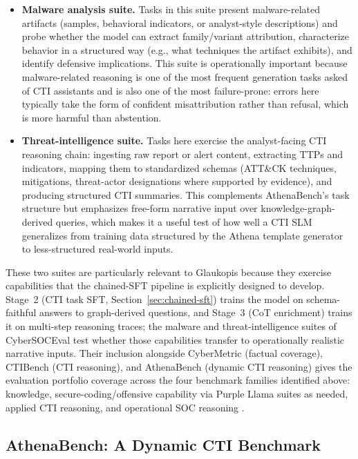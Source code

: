 \documentclass[unnumsec,webpdf,contemporary,large]{oup-authoring-template}
\theoremstyle{thmstyleone}
\theoremstyle{thmstyletwo}
\theoremstyle{thmstylethree}
\begin{document}
\begin{itemize}
  \item \textbf{Malware analysis suite.} Tasks in this suite present malware-related artifacts (samples, behavioral indicators, or analyst-style descriptions) and probe whether the model can extract family/variant attribution, characterize behavior in a structured way (e.g., what techniques the artifact exhibits), and identify defensive implications. This suite is operationally important because malware-related reasoning is one of the most frequent generation tasks asked of CTI assistants and is also one of the most failure-prone: errors here typically take the form of confident misattribution rather than refusal, which is more harmful than abstention.
  \item \textbf{Threat-intelligence suite.} Tasks here exercise the analyst-facing CTI reasoning chain: ingesting raw report or alert content, extracting TTPs and indicators, mapping them to standardized schemas (ATT\&CK techniques, mitigations, threat-actor designations where supported by evidence), and producing structured CTI summaries. This complements AthenaBench's task structure but emphasizes free-form narrative input over knowledge-graph-derived queries, which makes it a useful test of how well a CTI SLM generalizes from training data structured by the Athena template generator to less-structured real-world inputs.
\end{itemize}

These two suites are particularly relevant to Glaukopis because they exercise capabilities that the chained-SFT pipeline is explicitly designed to develop. Stage~2 (CTI task SFT, Section~\ref{sec:chained-sft}) trains the model on schema-faithful answers to graph-derived questions, and Stage~3 (CoT enrichment) trains it on multi-step reasoning traces; the malware and threat-intelligence suites of CyberSOCEval test whether those capabilities transfer to operationally realistic narrative inputs. Their inclusion alongside CyberMetric (factual coverage), CTIBench (CTI reasoning), and AthenaBench (dynamic CTI reasoning) gives the evaluation portfolio coverage across the four benchmark families identified above: knowledge, secure-coding/offensive capability via Purple Llama suites as needed, applied CTI reasoning, and operational SOC reasoning \cite{tihanyi2024cybermetric,alam2024ctibench,alam2025athenabench,bhatt2023purplellama,bhatt2024cyberseceval2,cybersoceval2025}.

\subsection{AthenaBench: A Dynamic CTI Benchmark}
\end{document}
